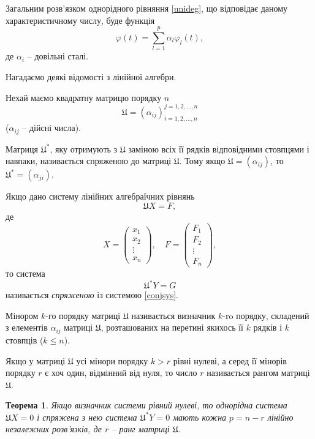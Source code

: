 \documentclass[14pt,twoside]{extreport}
\theoremstyle{mystyle}
\newtheorem{thm}{Теорема}
\numberwithin{equation}{chapter}
\begin{document}
\begin{enumerate}
Загальним розв'язком однорідного рівняння \eqref{unideg}, що відповідає даному характеристичному числу, буде функція
\begin{equation}
 \displaystyle \varphi(t)=\sum_{l=1}^{p}\alpha_{l}\varphi_{l}(t) ,
\end{equation}
де $\alpha_i$ -- довільні сталі.

Нагадаємо деякі відомості з лінійної алгебри.

Нехай маємо квадратну матрицю порядку $n$
\begin{equation}
 \mathfrak{U}=(\alpha_{ij})_{i=1, 2, \ldots, n}^{j=1, 2, \ldots, n}
\end{equation}
($\alpha_{ij}$ -- дійсні числа).

Матриця $\mathfrak{U}^*$, яку отримують з $\mathfrak{U}$ заміною всіх її рядків відповідними стовпцями і навпаки, називається спряженою до матриці $\mathfrak{U}$. Тому якщо $\mathfrak{U}= (\alpha_{ij})$, то $\mathfrak{U}^* = (\alpha_{ji})$.

Якщо дано систему лінійних алгебраїчних рівнянь
\begin{equation}\label{conjsys}
 \mathfrak{U}X=F,
\end{equation}
де
\[
 X=
\begin{pmatrix}
x_1\\
x_2\\
\vdots\\
x_n
\end{pmatrix},\quad
F=
\begin{pmatrix}
F_1\\
F_2\\
\vdots\\
F_n
\end{pmatrix},
\]
то система
\begin{equation}
\mathfrak{U}^*Y=G
\end{equation}
називається \emph{спряженою} із системою \eqref{conjsys}.

Мінором $k$-го порядку матриці $\mathfrak{U}$ називається визначник $k$-ro порядку, складений з елементів $\alpha_{ij}$ матриці $\mathfrak{U}$, розташованих на перетині якихось її $k$ рядків і $k$ стовпців ($k \leqslant n$).

Якщо у матриці $\mathfrak{U}$ усі мінори порядку $k>r$ рівні нулеві, а серед її мінорів порядку $r$ є хоч один, відмінний від нуля, то число $r$ називається рангом матриці $\mathfrak{U}$.
\begin{thm}\label{unithm}
 Якщо визначник системи рівний нулеві, то однорідна система $\mathfrak{U}X=0$ і спряжена з нею система $\mathfrak{U}^*Y=0$ мають кожна $p = n - r$ лінійно незалежних розв'язків, де $r$ -- ранг матриці $\mathfrak{U}$.
\end{thm}


\end{enumerate}
\end{document}
